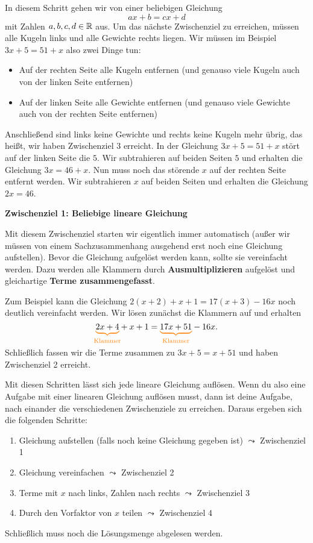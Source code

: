 \documentclass[../../main.tex]{subfiles}
\begin{document}
In diesem Schritt gehen wir von einer beliebigen Gleichung
\[ax+b=cx+d\]
mit Zahlen $a,b,c,d\in\mathbb{R}$ aus. Um das nächste Zwischenziel zu erreichen, müssen alle Kugeln links und alle Gewichte rechts liegen. Wir müssen im Beispiel $3x+5=51+x$ also zwei Dinge tun:
\begin{itemize}
    \item Auf der rechten Seite alle Kugeln entfernen (und genauso viele Kugeln auch von der linken Seite entfernen)
    \item Auf der linken Seite alle Gewichte entfernen (und genauso viele Gewichte auch von der rechten Seite entfernen)
\end{itemize}
Anschließend sind links keine Gewichte und rechts keine Kugeln mehr übrig, das heißt, wir haben Zwischenziel 3 erreicht. In der Gleichung $3x+5=51+x$ stört auf der linken Seite die $5$. Wir subtrahieren auf beiden Seiten $5$ und erhalten die Gleichung $3x=46+x$. Nun muss noch das störende $x$ auf der rechten Seite entfernt werden. Wir subtrahieren $x$ auf beiden Seiten und erhalten die Gleichung $2x=46$.

\textbf{Zwischenziel 1: Beliebige lineare Gleichung}

Mit diesem Zwischenziel starten wir eigentlich immer automatisch (außer wir müssen von einem Sachzusammenhang ausgehend erst noch eine Gleichung aufstellen). Bevor die Gleichung aufgelöst werden kann, sollte sie vereinfacht werden. Dazu werden alle Klammern durch \textbf{Ausmultiplizieren} aufgelöst und gleichartige \textbf{Terme zusammengefasst}.

Zum Beispiel kann die Gleichung $2(x+2)+x+1=17(x+3)-16x$ noch deutlich vereinfacht werden. Wir lösen zunächst die Klammern auf und erhalten
\[\colorbrace{2x+4}{\text{Klammer}}+x+1=\colorbrace{17x+51}{\text{Klammer}}-16x.\]
Schließlich fassen wir die Terme zusammen zu $3x+5=x+51$ und haben Zwischenziel 2 erreicht.

Mit diesen Schritten lässt sich jede lineare Gleichung auflösen. Wenn du also eine Aufgabe mit einer linearen Gleichung auflösen musst, dann ist deine Aufgabe, nach einander die verschiedenen Zwischenziele zu erreichen. Daraus ergeben sich die folgenden Schritte:
\begin{enumerate}
    \item[\tikzball{blue!40}{1}] Gleichung aufstellen (falls noch keine Gleichung gegeben ist) \hfill \textcolor{black!40}{$\leadsto$ Zwischenziel 1}
    \item[\tikzball{blue!40}{2}] Gleichung vereinfachen \hfill \textcolor{black!40}{$\leadsto$ Zwischenziel 2}
    \item[\tikzball{blue!40}{3}] Terme mit $x$ nach links, Zahlen nach rechts \hfill \textcolor{black!40}{$\leadsto$ Zwischenziel 3}
    \item[\tikzball{blue!40}{4}] Durch den Vorfaktor von $x$ teilen \hfill \textcolor{black!40}{$\leadsto$ Zwischenziel 4}
\end{enumerate}
Schließlich muss noch die Lösungsmenge abgelesen werden.
\end{document}
